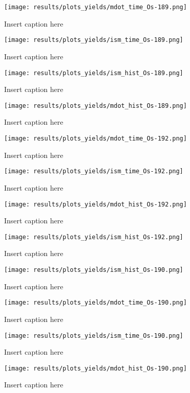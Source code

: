 \begin{figure}
  \centering
  \texttt{[image: results/plots\_yields/mdot\_time\_Os-189.png]}
  \caption{Insert caption here}
\end{figure}
\begin{figure}
  \centering
  \texttt{[image: results/plots\_yields/ism\_time\_Os-189.png]}
  \caption{Insert caption here}
\end{figure}
\begin{figure}
  \centering
  \texttt{[image: results/plots\_yields/ism\_hist\_Os-189.png]}
  \caption{Insert caption here}
\end{figure}
\begin{figure}
  \centering
  \texttt{[image: results/plots\_yields/mdot\_hist\_Os-189.png]}
  \caption{Insert caption here}
\end{figure}

\begin{figure}
  \centering
  \texttt{[image: results/plots\_yields/mdot\_time\_Os-192.png]}
  \caption{Insert caption here}
\end{figure}
\begin{figure}
  \centering
  \texttt{[image: results/plots\_yields/ism\_time\_Os-192.png]}
  \caption{Insert caption here}
\end{figure}
\begin{figure}
  \centering
  \texttt{[image: results/plots\_yields/mdot\_hist\_Os-192.png]}
  \caption{Insert caption here}
\end{figure}
\begin{figure}
  \centering
  \texttt{[image: results/plots\_yields/ism\_hist\_Os-192.png]}
  \caption{Insert caption here}
\end{figure}

\begin{figure}
  \centering
  \texttt{[image: results/plots\_yields/ism\_hist\_Os-190.png]}
  \caption{Insert caption here}
\end{figure}
\begin{figure}
  \centering
  \texttt{[image: results/plots\_yields/mdot\_time\_Os-190.png]}
  \caption{Insert caption here}
\end{figure}
\begin{figure}
  \centering
  \texttt{[image: results/plots\_yields/ism\_time\_Os-190.png]}
  \caption{Insert caption here}
\end{figure}
\begin{figure}
  \centering
  \texttt{[image: results/plots\_yields/mdot\_hist\_Os-190.png]}
  \caption{Insert caption here}
\end{figure}

